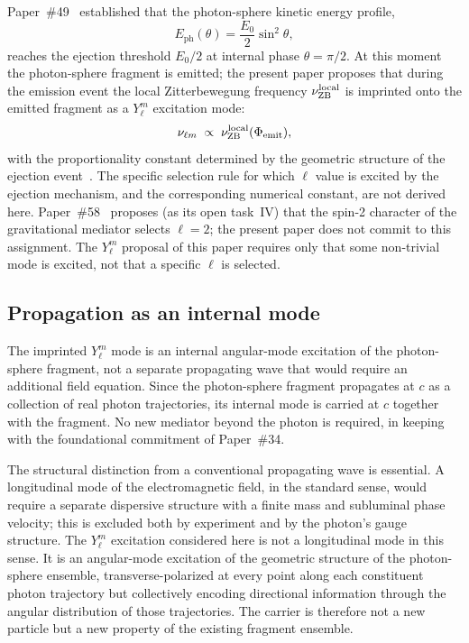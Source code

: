 \documentclass[%
 reprint, amsmath,amssymb, aps, prb, ]{revtex4-2}
\numberwithin{equation}{section}
\newcommand{\iphase}{\theta}
\newcommand{\nuZBl}{\nu_{\text{ZB}}^{\rm local}}
\newcommand{\EphS}{E_{\text{ph}}}
\begin{document}
Paper~\#49~\cite{hanamura49} established that the photon-sphere kinetic energy profile,
\begin{equation}
\EphS(\iphase) = \frac{E_0}{2}\sin^2\iphase,
\label{eq:eph}
\end{equation}
reaches the ejection threshold $E_0/2$ at internal phase $\iphase = \pi/2$. At this moment the photon-sphere fragment is emitted; the present paper proposes that during the emission event the local Zitterbewegung frequency $\nuZBl$ is imprinted onto the emitted fragment as a $Y_\ell^m$ excitation mode:
\begin{equation}
\nu_{\ell m} \;\propto\; \nuZBl(\Phi_{\rm emit}),
\label{eq:imprint}
\end{equation}
with the proportionality constant determined by the geometric structure of the ejection event~\cite{hanamura49}. The specific selection rule for which $\ell$ value is excited by the ejection mechanism, and the corresponding numerical constant, are not derived here. Paper~\#58~\cite{hanamura58} proposes (as its open task~IV) that the spin-2 character of the gravitational mediator selects $\ell = 2$; the present paper does not commit to this assignment. The $Y_\ell^m$ proposal of this paper requires only that some non-trivial mode is excited, not that a specific $\ell$ is selected.

\subsection{Propagation as an internal mode}

The imprinted $Y_\ell^m$ mode is an internal angular-mode excitation of the photon-sphere fragment, not a separate propagating wave that would require an additional field equation. Since the photon-sphere fragment propagates at $c$ as a collection of real photon trajectories, its internal mode is carried at $c$ together with the fragment. No new mediator beyond the photon is required, in keeping with the foundational commitment of Paper~\#34.

The structural distinction from a conventional propagating wave is essential. A longitudinal mode of the electromagnetic field, in the standard sense, would require a separate dispersive structure with a finite mass and subluminal phase velocity; this is excluded both by experiment and by the photon's gauge structure. The $Y_\ell^m$ excitation considered here is not a longitudinal mode in this sense. It is an angular-mode excitation of the geometric structure of the photon-sphere ensemble, transverse-polarized at every point along each constituent photon trajectory but collectively encoding directional information through the angular distribution of those trajectories. The carrier is therefore not a new particle but a new property of the existing fragment ensemble.
\end{document}
